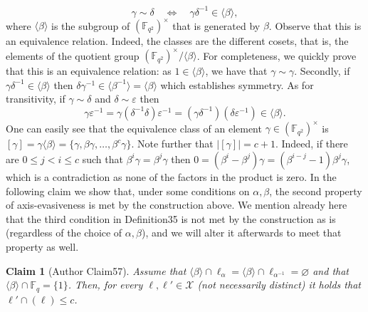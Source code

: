 \documentclass[10pt,a4paper]{article}
\newtheorem{ntclaim}[nttheorem]{Claim}
\begin{document}
\begin{equation}\gamma\sim\delta\quad\Longleftrightarrow\quad\gamma\delta^{-1}\in\langle\beta\rangle,\tag{5.1}\end{equation}
where $\langle\beta\rangle$ is the subgroup of $(\mathbb F_{q^2})^\times$ that is generated by $\beta$. Observe that this is an equivalence relation. Indeed, the classes are the different cosets, that is, the elements of the quotient group $(\mathbb F_{q^2})^\times/\langle\beta\rangle$. For completeness, we quickly prove that this is an equivalence relation: as $1\in\langle\beta\rangle$, we have that $\gamma\sim\gamma$. Secondly, if $\gamma\delta^{-1}\in\langle\beta\rangle$ then $\delta\gamma^{-1}\in\langle\beta^{-1}\rangle=\langle\beta\rangle$ which establishes symmetry. As for transitivity, if $\gamma\sim\delta$ and $\delta\sim\varepsilon$ then
\[\gamma\varepsilon^{-1}=\gamma(\delta^{-1}\delta)\varepsilon^{-1}=(\gamma\delta^{-1})(\delta\varepsilon^{-1})\in\langle\beta\rangle.\]
One can easily see that the equivalence class of an element $\gamma\in(\mathbb F_{q^2})^\times$ is $[\gamma]=\gamma\langle\beta\rangle=\{\gamma,\beta\gamma,\ldots,\beta^c\gamma\}$. Note further that $|[\gamma]|=c+1$. Indeed, if there are $0\leq j<i\leq c$ such that $\beta^i\gamma=\beta^j\gamma$ then $0=(\beta^i-\beta^j)\gamma=(\beta^{i-j}-1)\beta^j\gamma$, which is a contradiction as none of the factors in the product is zero.
In the following claim we show that, under some conditions on $\alpha,\beta$, the second property of axis-evasiveness is met by the construction above. We mention already here that the third condition in Definition35 is not met by the construction as is (regardless of the choice of $\alpha,\beta$), and we will alter it afterwards to meet that property as well.
\setcounter{nttheorem}{56}
\begin{ntclaim}[Author Claim57]
Assume that $\langle\beta\rangle\cap\ell_\alpha=\langle\beta\rangle\cap\ell_{\alpha^{-1}}=\varnothing$ and that $\langle\beta\rangle\cap\mathbb F_q=\{1\}$. Then, for every $\ell,\ell'\in\mathcal X$ (not necessarily distinct) it holds that $\ell'\cap(\ell)\leq c$.
\end{ntclaim}
\end{document}
